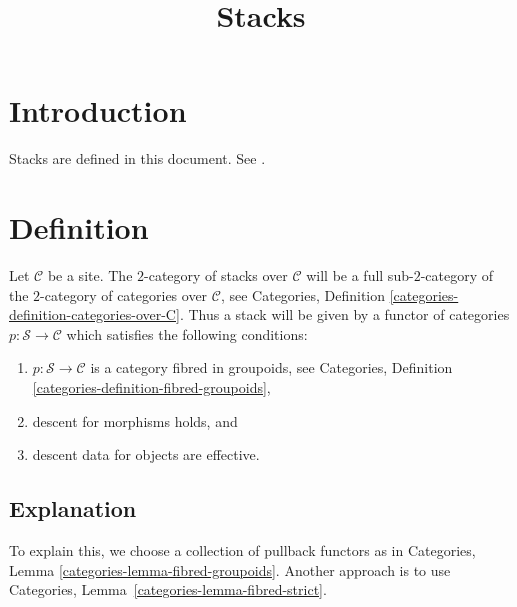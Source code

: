 

%


\title{Stacks}


\maketitle

\tableofcontents

\section{Introduction}
\label{section-introduction}

\noindent
Stacks are defined in this document. See \cite{DM}.

\section{Definition}
\label{section-definition}

\noindent
Let $\mathcal{C}$ be a site. The $2$-category of stacks over
$\mathcal{C}$ will be a full sub-$2$-category of the $2$-category
of categories over $\mathcal{C}$, see Categories, Definition
\ref{categories-definition-categories-over-C}. 
Thus a stack will be given by a functor of categories
$p : \mathcal{S} \to \mathcal{C}$ which satisfies the following
conditions:
\begin{enumerate}
\item $p : \mathcal{S} \to \mathcal{C}$ is a category fibred
in groupoids, see Categories, Definition 
\ref{categories-definition-fibred-groupoids},
\item descent for morphisms holds, and
\item descent data for objects are effective.
\end{enumerate}

\subsection{Explanation}
\label{subsection-definition-explanation}

\noindent
To explain this, we choose a collection of pullback functors as in
Categories, Lemma \ref{categories-lemma-fibred-groupoids}. Another approach
is to use Categories, Lemma~\ref*{categories-lemma-fibred-strict}.

